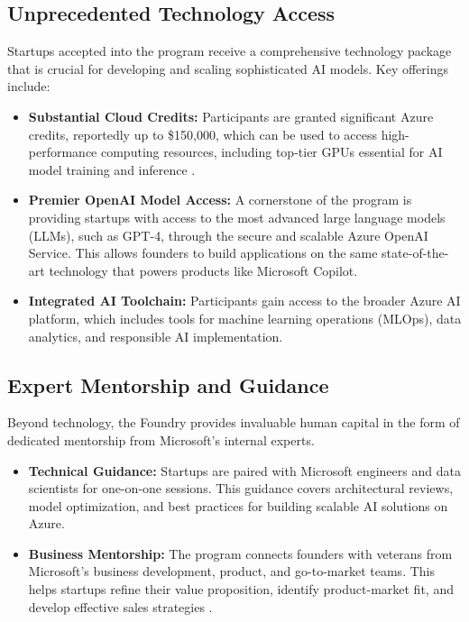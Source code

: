 \documentclass[11pt, a4paper]{article}
\begin{document}
\subsection{Unprecedented Technology Access}
Startups accepted into the program receive a comprehensive technology package that is crucial for developing and scaling sophisticated AI models. Key offerings include:
\begin{itemize}
    \item \textbf{Substantial Cloud Credits:} Participants are granted significant Azure credits, reportedly up to \$150,000, which can be used to access high-performance computing resources, including top-tier GPUs essential for AI model training and inference \cite{venturebeat_analysis}.
    \item \textbf{Premier OpenAI Model Access:} A cornerstone of the program is providing startups with access to the most advanced large language models (LLMs), such as GPT-4, through the secure and scalable Azure OpenAI Service. This allows founders to build applications on the same state-of-the-art technology that powers products like Microsoft Copilot.
    \item \textbf{Integrated AI Toolchain:} Participants gain access to the broader Azure AI platform, which includes tools for machine learning operations (MLOps), data analytics, and responsible AI implementation.
\end{itemize}

\subsection{Expert Mentorship and Guidance}
Beyond technology, the Foundry provides invaluable human capital in the form of dedicated mentorship from Microsoft's internal experts.
\begin{itemize}
    \item \textbf{Technical Guidance:} Startups are paired with Microsoft engineers and data scientists for one-on-one sessions. This guidance covers architectural reviews, model optimization, and best practices for building scalable AI solutions on Azure.
    \item \textbf{Business Mentorship:} The program connects founders with veterans from Microsoft's business development, product, and go-to-market teams. This helps startups refine their value proposition, identify product-market fit, and develop effective sales strategies \cite{msft_blog}.
\end{itemize}
\end{document}
